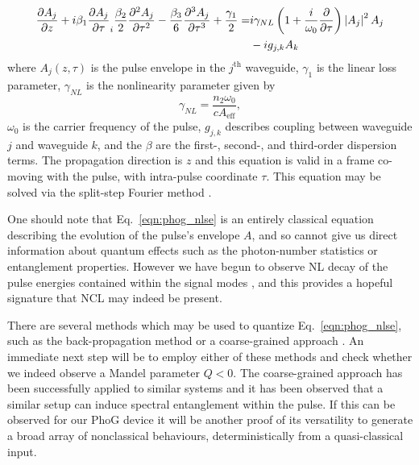 \begin{align}\label{eqn:phog_nlse}
\frac{\partial A_j}{\partial z} + i \beta_1 \frac{\partial A_j}{\partial \tau} _ i \frac{\beta_2}{2} \frac{\partial^2 A_j}{\partial \tau^2} - \frac{\beta_3}{6} \frac{\partial^3 A_j}{\partial \tau^3} + \frac{\gamma_1}{2} = &i \gamma_{NL} \left( 1 + \frac{i}{\omega_0} \frac{\partial}{\partial \tau}\right)\left|A_j\right|^2 A_j \notag \\
&- i g_{j, k} A_k
\end{align}
where $A_j\left(z, \tau\right)$ is the pulse envelope in the $j^{\text{th}}$ waveguide, $\gamma_1$ is the linear loss parameter, $\gamma_{NL}$ is the nonlinearity parameter given by
\begin{equation}
\gamma_{NL} = \frac{n_2 \omega_0}{c A_{\text{eff}}},
\end{equation}
$\omega_0$ is the carrier frequency of the pulse, $g_{j, k}$ describes coupling between waveguide $j$ and waveguide $k$, and the $\beta$ are the first-, second-, and third-order dispersion terms. The propagation direction is $z$ and this equation is valid in a frame co-moving with the pulse, with intra-pulse coordinate $\tau$. This equation may be solved via the split-step Fourier method \cite{Agrawal2012}.

One should note that Eq.~\ref{eqn:phog_nlse} is an entirely classical equation describing the evolution of the pulse's envelope $A$, and so cannot give us direct information about quantum effects such as the photon-number statistics or entanglement properties. However we have begun to observe NL decay of the pulse energies contained within the signal modes \cite{Thornton2019a}, and this provides a hopeful signature that NCL may indeed be present.

There are several methods which may be used to quantize Eq.~\ref{eqn:phog_nlse}, such as the back-propagation method \cite{Lai1995, Hosaka2015, Mecozzi1997} or a coarse-grained approach \cite{Hosaka2016, Nishizawa1999, Fiorentino2002, Ju2012, Doerr1994}. An immediate next step will be to employ either of these methods and check whether we indeed observe a Mandel parameter $Q < 0$. The coarse-grained approach has been successfully applied to similar systems and it has been observed \cite{Ju2012} that a similar setup can induce spectral entanglement within the pulse. If this can be observed for our PhoG device it will be another proof of its versatility to generate a broad array of nonclassical behaviours, deterministically from a quasi-classical input.



